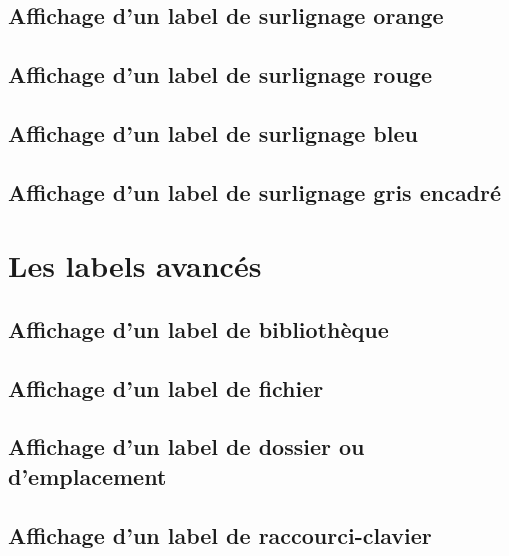 \subsection{Affichage d'un label de surlignage orange}

\subsection{Affichage d'un label de surlignage rouge}

\subsection{Affichage d'un label de surlignage bleu}

\subsection{Affichage d'un label de surlignage gris encadré}


\section{Les labels avancés}

\subsection{Affichage d'un label de bibliothèque}

\subsection{Affichage d'un label de fichier}

\subsection{Affichage d'un label de dossier ou d'emplacement}

\subsection{Affichage d'un label de raccourci-clavier}


